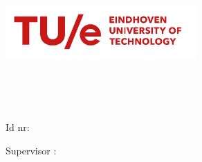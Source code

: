 
\begin{titlepage}
    \begin{center}
        \vspace{1.6cm}
        \includegraphics[height=2cm]{figures/TUe-logo-descriptor-line-scarlet-rgb}\\
        \vspace{1.6cm}

        \Large
        \department\\
        \group\\
        \vspace*{1cm}
        \Huge
        \textbf{\doctitle}
        \vspace{0.5cm}

        \LARGE
        \docsubtitle
        \vspace{1.5cm}

        \large
        \textbf{\me}\\
        \vspace{0.4cm}
        Id nr: \studentNumber \\
        \texttt{\email}
        \vfill


        Supervisor : \firstCommitteeMember\\

        \vfill

        \vfill
        \builddate \\

    \end{center}
\end{titlepage}